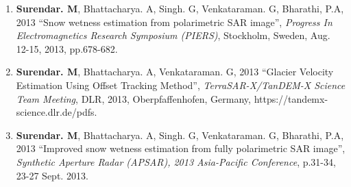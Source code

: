 \begin{enumerate}
\item \textbf{Surendar. M}, Bhattacharya. A, Singh. G, Venkataraman. G, Bharathi, P.A, 2013 \textquotedblleft Snow wetness estimation from polarimetric SAR image\textquotedblright, \textit{Progress In Electromagnetics Research Symposium (PIERS)}, Stockholm, Sweden, Aug. 12-15, 2013, pp.678-682.

\item \textbf{Surendar. M}, Bhattacharya. A, Venkataraman. G, 2013 \textquotedblleft Glacier Velocity Estimation Using Offset Tracking Method\textquotedblright, \textit{TerraSAR-X/TanDEM-X Science Team Meeting}, DLR, 2013, Oberpfaffenhofen, Germany, https://tandemx-science.dlr.de/pdfs.

\item \textbf{Surendar. M}, Bhattacharya. A, Singh. G, Venkataraman. G, Bharathi, P.A, 2013 \textquotedblleft Improved snow wetness estimation from fully polarimetric SAR image\textquotedblright, \textit{Synthetic Aperture Radar (APSAR), 2013 Asia-Pacific Conference}, p.31-34, 23-27 Sept. 2013.

\end{enumerate}
